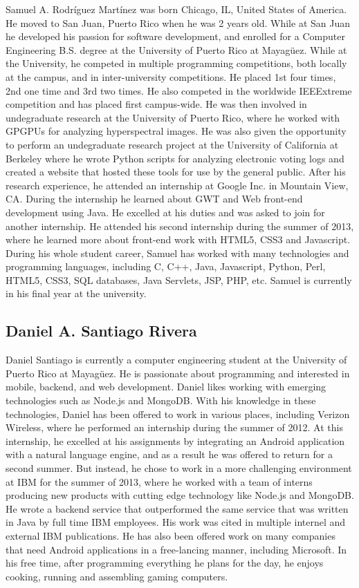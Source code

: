 Samuel A. Rodríguez Martínez was born Chicago, IL, United States of America. He
moved to San Juan, Puerto Rico when he was 2 years old. While at San Juan he
developed his passion for software development, and enrolled for a Computer
Engineering B.S. degree at the University of Puerto Rico at Mayagüez. While at
the University, he competed in multiple programming competitions, both locally
at the campus, and in inter-university competitions. He placed 1st four times,
2nd one time and 3rd two times. He also competed in the worldwide IEEExtreme
competition and has placed first campus-wide. He was then involved in
undegraduate research at the University of Puerto Rico, where he worked with
GPGPUs for analyzing hyperspectral images. He was also given the opportunity to
perform an undegraduate research project at the University of California at
Berkeley where he wrote Python scripts for analyzing electronic voting logs and
created a website that hosted these tools for use by the general public. After
his research experience, he attended an internship at Google Inc. in Mountain
View, CA. During the internship he learned about GWT and Web front-end
development using Java. He excelled at his duties and was asked to join for
another internship. He attended his second internship during the summer of 2013,
where he learned more about front-end work with HTML5, CSS3 and Javascript.
During his whole student career, Samuel has worked with many technologies and
programming languages, including C, C++, Java, Javascript, Python, Perl, HTML5,
CSS3, SQL databases, Java Servlets, JSP, PHP, etc. Samuel is currently in his
final year at the university.

\subsection*{Daniel A. Santiago Rivera}

Daniel Santiago is currently a computer engineering student at the University of
Puerto Rico at Mayagüez. He is passionate about programming and interested in
mobile, backend, and web development. Daniel likes working with emerging
technologies such as Node.js and MongoDB. With his knowledge in these
technologies, Daniel has been offered to work in various places, including
Verizon Wireless, where he performed an internship during the summer of 2012. At
this internship, he excelled at his assignments by integrating an Android
application with a natural language engine, and as a result he was offered to
return for a second summer. But instead, he chose to work in a more challenging
environment at IBM for the summer of 2013, where he worked with a team of
interns producing new products with cutting edge technology like Node.js and
MongoDB. He wrote a backend service that outperformed the same service that was
written in Java by full time IBM employees. His work was cited in multiple
internel and external IBM publications. He has also been offered work on many
companies that need Android applications in a free-lancing manner, including
Microsoft. In his free time, after programming everything he plans for the day,
he enjoys cooking, running and assembling gaming computers.
